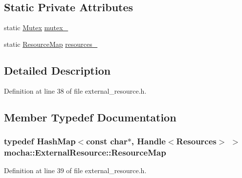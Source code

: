 \subsection*{Static Private Attributes}
\begin{DoxyCompactItemize}
\item 
static \hyperlink{classmocha_1_1_mutex}{Mutex} \hyperlink{classmocha_1_1_external_resource_a79acd6713f0f1923efc59dae6a8cd61c}{mutex\_\-}
\item 
static \hyperlink{classmocha_1_1_hash_map}{ResourceMap} \hyperlink{classmocha_1_1_external_resource_a31d3e9277c6e9150224e9cc181b042d3}{resources\_\-}
\end{DoxyCompactItemize}


\subsection{Detailed Description}


Definition at line 38 of file external\_\-resource.h.



\subsection{Member Typedef Documentation}
\hypertarget{classmocha_1_1_external_resource_af0eea09b4fa837b559799d0d6fa1ac95}{
\subsubsection[{ResourceMap}]{\setlength{\rightskip}{0pt plus 5cm}typedef {\bf HashMap}$<$const char$\ast$, {\bf Handle}$<${\bf Resources}$>$ $>$ {\bf mocha::ExternalResource::ResourceMap}}}
\label{classmocha_1_1_external_resource_af0eea09b4fa837b559799d0d6fa1ac95}


Definition at line 39 of file external\_\-resource.h.



